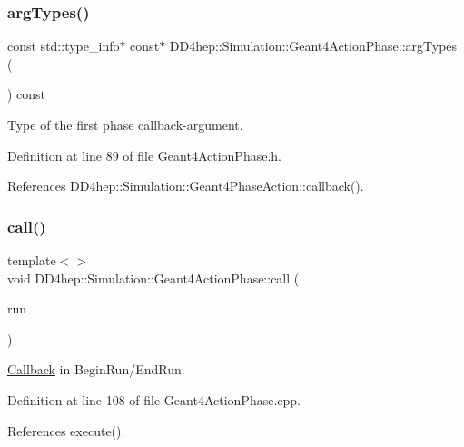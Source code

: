 \subsubsection{\texorpdfstring{arg\+Types()}{argTypes()}}
{\footnotesize\ttfamily const std\+::type\+\_\+info$\ast$ const$\ast$ D\+D4hep\+::\+Simulation\+::\+Geant4\+Action\+Phase\+::arg\+Types (\begin{DoxyParamCaption}{ }\end{DoxyParamCaption}) const\hspace{0.3cm}{\ttfamily [inline]}}



Type of the first phase callback-\/argument. 



Definition at line 89 of file Geant4\+Action\+Phase.\+h.



References D\+D4hep\+::\+Simulation\+::\+Geant4\+Phase\+Action\+::callback().

\hypertarget{class_d_d4hep_1_1_simulation_1_1_geant4_action_phase_a48db97b858e89fa3a616146de4f54658}{}\label{class_d_d4hep_1_1_simulation_1_1_geant4_action_phase_a48db97b858e89fa3a616146de4f54658} 
\subsubsection{\texorpdfstring{call()}{call()}\hspace{0.1cm}{\footnotesize\ttfamily [1/12]}}
{\footnotesize\ttfamily template$<$$>$ \\
void D\+D4hep\+::\+Simulation\+::\+Geant4\+Action\+Phase\+::call (\begin{DoxyParamCaption}\item[{const G4\+Run $\ast$}]{run }\end{DoxyParamCaption})}



\hyperlink{class_d_d4hep_1_1_callback}{Callback} in Begin\+Run/\+End\+Run. 



Definition at line 108 of file Geant4\+Action\+Phase.\+cpp.



References execute().

\hypertarget{class_d_d4hep_1_1_simulation_1_1_geant4_action_phase_a9ca732b90a5182ed85e2c4e912ebbe81}{}\label{class_d_d4hep_1_1_simulation_1_1_geant4_action_phase_a9ca732b90a5182ed85e2c4e912ebbe81} 
